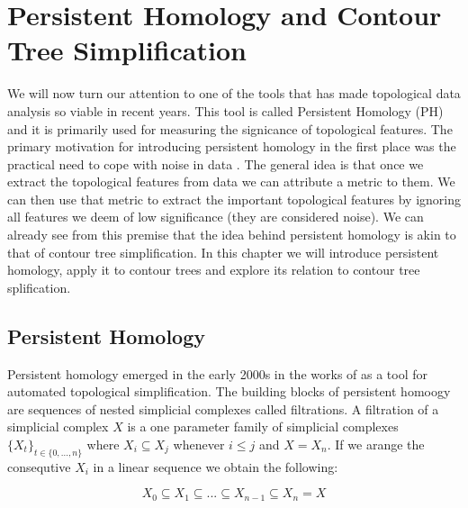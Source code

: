 \chapter{Persistent Homology and Contour Tree Simplification}
\label{chapter6}

We will now turn our attention to one of the tools that has made topological data analysis so viable in recent years. This tool is called Persistent Homology (PH) and it is primarily used for measuring the signicance of topological features. The primary motivation for introducing persistent homology in the first place was the practical need to cope with noise in data \cite{comp-topo}. The general idea is that once we extract the topological features from data we can attribute a metric to them. We can then use that metric to extract the important topological features by ignoring all features we deem of low significance (they are considered noise). We can already see from this premise that the idea behind persistent homology is akin to that of contour tree simplification. In this chapter we will introduce persistent homology, apply it to contour trees and explore its relation to contour tree splification.


\section{Persistent Homology}


Persistent homology emerged in the early 2000s in the works of \cite{persistence-original} as a tool for automated topological simplification. The building blocks of persistent homoogy are sequences of nested simplicial complexes called filtrations. A filtration of a simplicial complex $X$ is a one parameter family of simplicial complexes $\{X_t\}_{t \in \{0, ..., n\}}$ where $X_i \subseteq X_j$ whenever $i \le j$ and $X = X_n$. If we arange the consequtive $X_i$ in a linear sequence we obtain the following:


$$ X_0 \subseteq X_1 \subseteq ... \subseteq X_{n-1} \subseteq X_n = X$$

